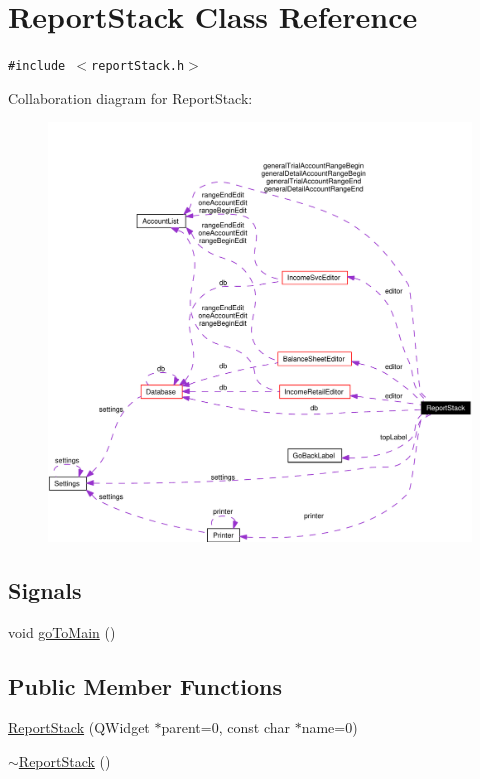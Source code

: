 \hypertarget{classReportStack}{
\section{Report\-Stack Class Reference}
\label{classReportStack}
}
{\tt \#include $<$report\-Stack.h$>$}

Collaboration diagram for Report\-Stack:\begin{figure}[H]
\begin{center}
\leavevmode
\includegraphics[width=320pt]{classReportStack__coll__graph}
\end{center}
\end{figure}
\subsection*{Signals}
\begin{CompactItemize}
\item 
void \hyperlink{classReportStack_l0}{go\-To\-Main} ()
\end{CompactItemize}
\subsection*{Public Member Functions}
\begin{CompactItemize}
\item 
\hyperlink{classReportStack_a0}{Report\-Stack} (QWidget $\ast$parent=0, const char $\ast$name=0)
\item 
\hyperlink{classReportStack_a1}{$\sim$Report\-Stack} ()
\end{CompactItemize}
